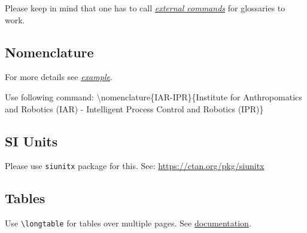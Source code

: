 Please keep in mind that one has to call \href{https://www.dickimaw-books.com/cgi-bin/faq.cgi?action=view&categorylabel=glossaries#noglossary}{\textit{external commands}} for glossaries to work.


\subsection{Nomenclature}
For more details see \href{https://tex.stackexchange.com/questions/27824/using-package-nomencl}{\textit{example}}.

Use following command:
\textbackslash nomenclature\{IAR-IPR\}\{Institute for Anthropomatics and Robotics (IAR) - Intelligent Process Control and Robotics (IPR)\}


\subsection{SI Units}
Please use \texttt{siunitx} package for this. See:  \url{https://ctan.org/pkg/siunitx}

\subsection{Tables}
\begin{table}[H]
\caption{Tables have caption on top.}
\label{tab:table_caption}
\centering
{}
\end{table}

Use \texttt{\textbackslash longtable} for tables over multiple pages. See \href{https://de.wikibooks.org/wiki/LaTeX-W%C3%B6rterbuch:_longtable_(Umgebung)}{documentation}.

